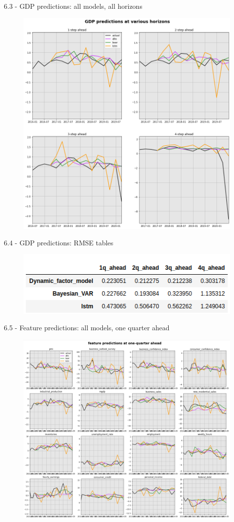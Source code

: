 \begin{frame}{6.3 - GDP predictions: all models, all horizons}
\begin{figure}[h]
	\centering
	\includegraphics[width=.6\linewidth]{im2}
\end{figure}
\end{frame}

\begin{frame}{6.4 - GDP predictions: RMSE tables}
\begin{figure}[h]
	\centering
	\includegraphics[width=0.8\linewidth]{im3}
\end{figure}
\end{frame}

\begin{frame}{6.5 - Feature predictions: all models, one quarter ahead}
\begin{figure}[h]
	\centering
	\includegraphics[width=0.8\linewidth]{im4}
\end{figure}
\end{frame}

